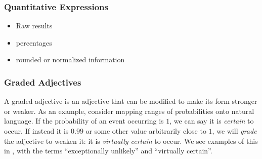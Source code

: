 \subsubsection{Quantitative Expressions}
\begin{itemize}
   \item Raw results
   \item percentages
   \item rounded or normalized information
\end{itemize}

\subsubsection{Graded Adjectives}
A graded adjective is an adjective that can be modified to make its form stronger or weaker.
As an example, consider mapping ranges of probabilities onto natural language. If the probability
of an event occurring is $1$, we can say it is \emph{certain} to occur. If instead it is $0.99$
or some other value arbitrarily close to $1$, we will \emph{grade} the adjective to weaken it:
it is \emph{virtually certain} to occur. We see examples of this in ,
with the terms ``exceptionally unlikely'' and ``virtually certain''.


